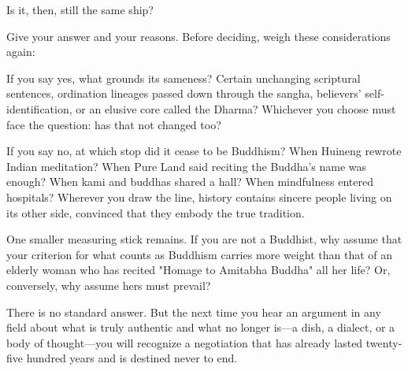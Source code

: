 Is it, then, still the same ship?

Give your answer and your reasons. Before deciding, weigh these considerations again:

If you say yes, what grounds its sameness? Certain unchanging scriptural sentences, ordination lineages passed down through the sangha, believers' self-identification, or an elusive core called the Dharma? Whichever you choose must face the question: has that not changed too?

If you say no, at which stop did it cease to be Buddhism? When Huineng rewrote Indian meditation? When Pure Land said reciting the Buddha's name was enough? When kami and buddhas shared a hall? When mindfulness entered hospitals? Wherever you draw the line, history contains sincere people living on its other side, convinced that they embody the true tradition.

One smaller measuring stick remains. If you are not a Buddhist, why assume that your criterion for what counts as Buddhism carries more weight than that of an elderly woman who has recited "Homage to Amitabha Buddha" all her life? Or, conversely, why assume hers must prevail?

There is no standard answer. But the next time you hear an argument in any field about what is truly authentic and what no longer is---a dish, a dialect, or a body of thought---you will recognize a negotiation that has already lasted twenty-five hundred years and is destined never to end.
